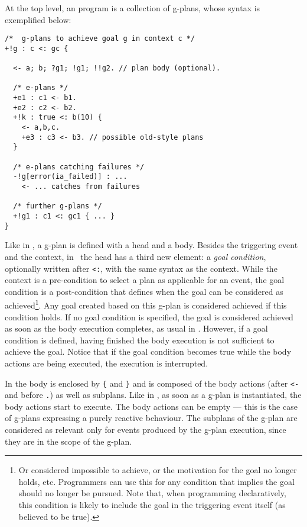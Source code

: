 At the top level, an {\aser} program is a collection of g-plans, whose
syntax is exemplified below:
%
%
{\small
\begin{verbatim}
/*  g-plans to achieve goal g in context c */
+!g : c <: gc { 

  <- a; b; ?g1; !g1; !!g2. // plan body (optional).

  /* e-plans */
  +e1 : c1 <- b1.	
  +e2 : c2 <- b2.
  +!k : true <: b(10) {
    <- a,b,c.
    +e3 : c3 <- b3. // possible old-style plans
  }	
  
  /* e-plans catching failures */
  -!g[error(ia_failed)] : ...
    <- ... catches from failures 

  /* further g-plans */
  +!g1 : c1 <: gc1 { ... }
}
\end{verbatim}}

Like in {\asl}, a g-plan is defined with a head and a body.
%
Besides the triggering event and the context, in \aser\ the head has a
third new element: a \emph{goal condition}, optionally written after
\texttt{<:}, with the same syntax as the context. While the context is
a pre-condition to select a plan as applicable for an event, the goal
condition is a post-condition that defines when the goal can be
considered as achieved\footnote{Or considered impossible to achieve,
  or the motivation for the goal no longer holds, etc. Programmers can
  use this for any condition that implies the goal should no longer be
  pursued. Note that, when programming declaratively, this condition
  is likely to include the goal in the triggering event itself (as
  believed to be true).}. Any goal created based on this g-plan is
considered achieved if %
this condition holds. If no goal condition is specified, the goal is
considered achieved as soon as the body execution completes, as usual
in \asl. However, if a goal condition is defined, having finished the
body execution is not sufficient to achieve the goal. Notice that if
the goal condition becomes true while the body actions are being
executed, the execution is interrupted. 

In {\aser} the body is enclosed by \texttt{\{} and \texttt{\}} and is
composed of the body actions (after \texttt{<-} and before \texttt{.})
as well as subplans. 
%
Like in {\asl}, as soon as a g-plan is instantiated, the body actions
start to execute. The body actions can be empty --- this is the case
of g-plans expressing a purely reactive behaviour.
%
The subplans of the g-plan are considered as relevant only for events
produced by the g-plan execution, since they are in the scope of the g-plan.

